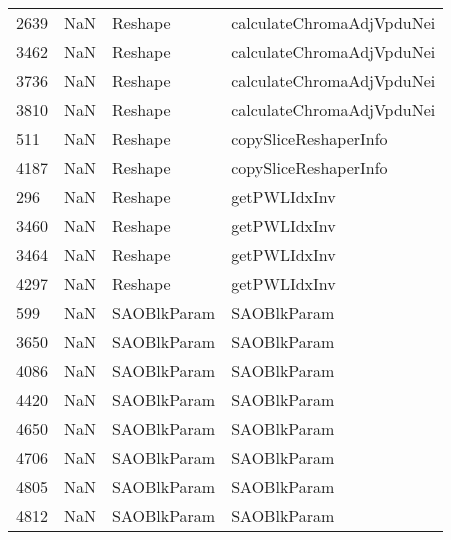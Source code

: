 \begin{tabular}{llll}
2639 &                   NaN &                    Reshape &                 calculateChromaAdjVpduNei \\
3462 &                   NaN &                    Reshape &                 calculateChromaAdjVpduNei \\
3736 &                   NaN &                    Reshape &                 calculateChromaAdjVpduNei \\
3810 &                   NaN &                    Reshape &                 calculateChromaAdjVpduNei \\
511  &                   NaN &                    Reshape &                     copySliceReshaperInfo \\
4187 &                   NaN &                    Reshape &                     copySliceReshaperInfo \\
296  &                   NaN &                    Reshape &                              getPWLIdxInv \\
3460 &                   NaN &                    Reshape &                              getPWLIdxInv \\
3464 &                   NaN &                    Reshape &                              getPWLIdxInv \\
4297 &                   NaN &                    Reshape &                              getPWLIdxInv \\
599  &                   NaN &                SAOBlkParam &                               SAOBlkParam \\
3650 &                   NaN &                SAOBlkParam &                               SAOBlkParam \\
4086 &                   NaN &                SAOBlkParam &                               SAOBlkParam \\
4420 &                   NaN &                SAOBlkParam &                               SAOBlkParam \\
4650 &                   NaN &                SAOBlkParam &                               SAOBlkParam \\
4706 &                   NaN &                SAOBlkParam &                               SAOBlkParam \\
4805 &                   NaN &                SAOBlkParam &                               SAOBlkParam \\
4812 &                   NaN &                SAOBlkParam &                               SAOBlkParam \\

\end{tabular}
